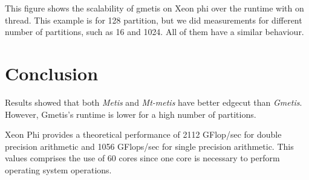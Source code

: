 \documentclass[abstract=on,9pt,twocolumn]{scrartcl}
\begin{document}
This figure shows the scalability of gmetis on Xeon phi over the runtime
with on thread. This example is for 128 partition, but we did
measurements for different number of partitions, such as 16 and 1024. All
of them have a similar behaviour.


\section{Conclusion}
\label{sec:conc}
Results showed that both \textit{Metis} and \textit{Mt-metis} have
better edgecut than \textit{Gmetis}. However, Gmetis's runtime is lower
for a high number of partitions.


Xeon Phi provides a theoretical performance of 2112 GFlop/sec for double
precision arithmetic and 1056 GFlops/sec for single precision
arithmetic. This values comprises the use of 60 cores since one core is
necessary to perform operating system operations.






\end{document}
